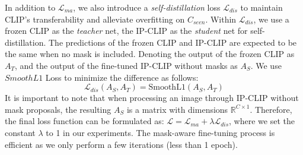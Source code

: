 In addition to $\mathcal{L}_{ma}$, we also introduce a \textit{self-distillation} loss $\mathcal{L}_{dis}$ to maintain CLIP's transferability and alleviate overfitting on $C_{seen}$. 
Within $\mathcal{L}_{dis}$, we use a frozen CLIP as the \textit{teacher} net, the  IP-CLIP as the \textit{student} net for self-distillation.
The predictions of the frozen CLIP and IP-CLIP are expected to be the same when no mask is included. Denoting the output of the frozen CLIP as $A_{T}$, and the output of the fine-tuned IP-CLIP without masks as $A_{S}$. We use $SmoothL1$ Loss to minimize the difference as follows:
\begin{equation}
\mathcal{L}_{dis}(A_{S}, A_{T}) = \mathrm{SmoothL1} (A_{S}, A_{T})
\end{equation}
It is important to note that when processing an image through IP-CLIP without mask proposals, the resulting $A_{S}$ is a matrix with dimensions $\mathbb{R}^{C \times 1}$.
Therefore, the final loss function can be formulated as: $\mathcal{L} = \mathcal{L}_{ma} + {\lambda} {\mathcal{L}_{dis}}$, where we set the constant $\lambda$ to 1 in our experiments. The mask-aware fine-tuning process is efficient as we only perform a few iterations (less than 1 epoch).
